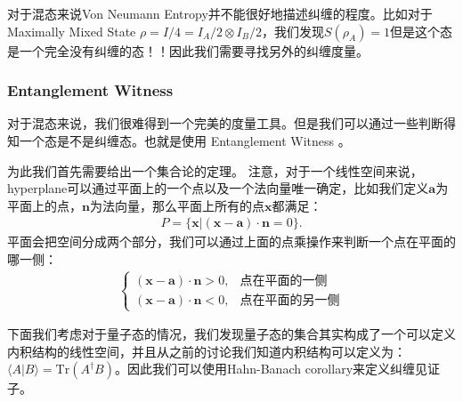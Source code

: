 对于混态来说Von Neumann Entropy并不能很好地描述纠缠的程度。比如对于Maximally Mixed State $
\rho = I/4  = I_A/2 \otimes I_B/2 $，我们发现$ S(\rho_A) = 1
$但是这个态是一个完全没有纠缠的态！！因此我们需要寻找另外的纠缠度量。

\subsubsection{Entanglement Witness}

对于混态来说，我们很难得到一个完美的度量工具。但是我们可以通过一些判断得知一个态是不是纠缠态。也就是使用 Entanglement Witness 。

\bigskip
{}

为此我们首先需要给出一个集合论的定理。
注意，对于一个线性空间来说，hyperplane可以通过平面上的一个点以及一个法向量唯一确定，比如我们定义$ \mathbf{a}
$为平面上的点，$ \mathbf{n} $为法向量，那么平面上所有的点$ \mathbf{x} $都满足：
\begin{align}
  P = \{\mathbf{x} | (\mathbf{x} - \mathbf{a}) \cdot \mathbf{n} = 0 \}.
\end{align}
平面会把空间分成两个部分，我们可以通过上面的点乘操作来判断一个点在平面的哪一侧：
\begin{align}
  \begin{cases}
    (\mathbf{x} - \mathbf{a}) \cdot \mathbf{n} > 0, & \text{点在平面的一侧} \\
    (\mathbf{x} - \mathbf{a}) \cdot \mathbf{n} < 0, & \text{点在平面的另一侧}
  \end{cases}
\end{align}

\bigskip
{}

下面我们考虑对于量子态的情况，我们发现量子态的集合其实构成了一个可以定义内积结构的线性空间，并且从之前的讨论我们知道内积结构可以定义为：$
\langle A | B \rangle = \mathrm{Tr}(A^\dagger B)
$。因此我们可以使用Hahn-Banach corollary来定义纠缠见证子。

